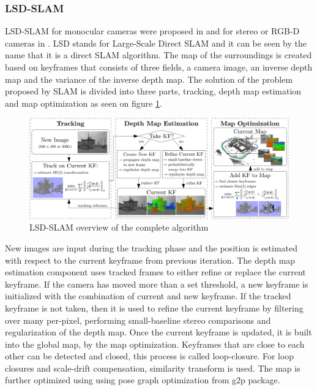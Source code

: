 \subsubsection{LSD-SLAM}

LSD-SLAM for monocular cameras were proposed in \cite{engel2014lsd} and for stereo or RGB-D cameras in \cite{engel2015large}.
LSD stands for Large-Scale Direct SLAM and it can be seen by the name that it is a direct SLAM algorithm.
The map of the surroundings is created based on keyframes that consists of three fields, a camera image, an inverse depth map
and the variance of the inverse depth map. The solution of the problem proposed by SLAM is divided into three parts, tracking,
depth map estimation and map optimization as seen on figure \ref{fig:lsd_slam_overview}.


\begin{figure}[!ht]
    \centering
    \includegraphics[width=150mm, keepaspectratio]{figures/lsd_slam_overview.png}
    \caption{LSD-SLAM overview of the complete algorithm \cite{engel2014lsd}}
    \label{fig:lsd_slam_overview}
\end{figure}

New images are input during the tracking phase and the position is estimated with respect to the current keyframe from 
previous iteration. The depth map estimation component uses tracked frames to either refine or replace the current keyframe.
If the camera has moved more than a set threshold, a new keyframe is initialized with the combination of current and new 
keyframe. If the tracked keyframe is not taken, then it is used to refine the current keyframe by filtering over many per-pixel,
performing small-baseline stereo comparisons and regularization of the depth map. Once the current keyframe is updated, it is 
built into the global map, by the map optimization.
Keyframes that are close to each other can be detected and closed, this process is called loop-closure. For loop closures and
scale-drift compensation, similarity transform is used. The map is further optimized using using pose graph optimization from 
g2p package.


